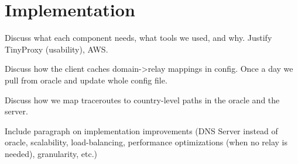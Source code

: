 \section{Implementation}

Discuss what each component needs, what tools we used, and why.  Justify TinyProxy (usability), AWS.

Discuss how the client caches domain->relay mappings in config.  Once a day we pull from oracle and update whole config file.

Discuss how we map traceroutes to country-level paths in the oracle and the server.

Include paragraph on implementation improvements (DNS Server instead of oracle, scalability, load-balancing, performance optimizations (when no relay is needed), granularity, etc.)

